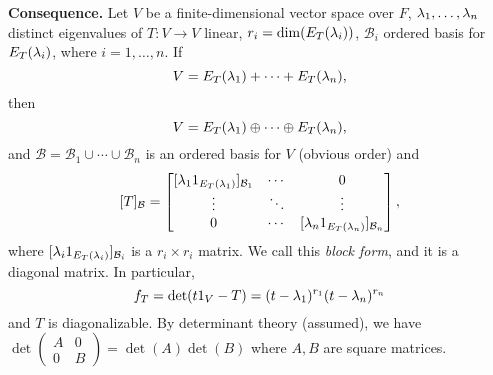 \documentclass[class=article, crop=false]{standalone}
\begin{document}
  \textbf{Consequence.} Let $V$ be a finite-dimensional vector space over $F$, $\lambda_1,\dotsc,\lambda_n$ distinct eigenvalues of $T\colon V\to V$ linear, $r_i = \dim(E_T(\lambda_i))$, $\mathcal{B}_i$ ordered basis for $E_T(\lambda_i)$, where $i = 1,\dotsc,n$. If
  \[
    V = E_T(\lambda_1) + \dotsb + E_T(\lambda_n),
  \]
  then
  \[
    V = E_T(\lambda_1) \oplus \dotsb \oplus E_T(\lambda_n),
  \]
  and $\mathcal{B} = \mathcal{B}_1\cup\dotsb\cup \mathcal{B}_n$ is an ordered basis for $V$ (obvious order) and
  \[
    [T]_{\mathcal{B}} = \begin{bmatrix}[\lambda_1 1_{E_T(\lambda_1)}]_{\mathcal{B}_1} & \cdots & 0 \\ \vdots & \ddots & \vdots\\ 0 & \cdots & [\lambda_n 1_{E_T(\lambda_n)}]_{\mathcal{B}_n}\end{bmatrix},
  \]
  where $[\lambda_i 1_{E_T(\lambda_i)}]_{\mathcal{B}_i}$ is a $r_i\times r_i$ matrix. We call this \emph{block form}, and it is a diagonal matrix. In particular, 
  \[
    f_T = \det(t 1_V - T) = (t - \lambda_1)^{r_1}(t - \lambda_n)^{r_n}
  \]
  and $T$ is diagonalizable. By determinant theory (assumed), we have $\det \begin{pmatrix}A&0\\0&B\end{pmatrix} = \det(A)\det(B)$ where $A,B$ are square matrices.
\end{document}
